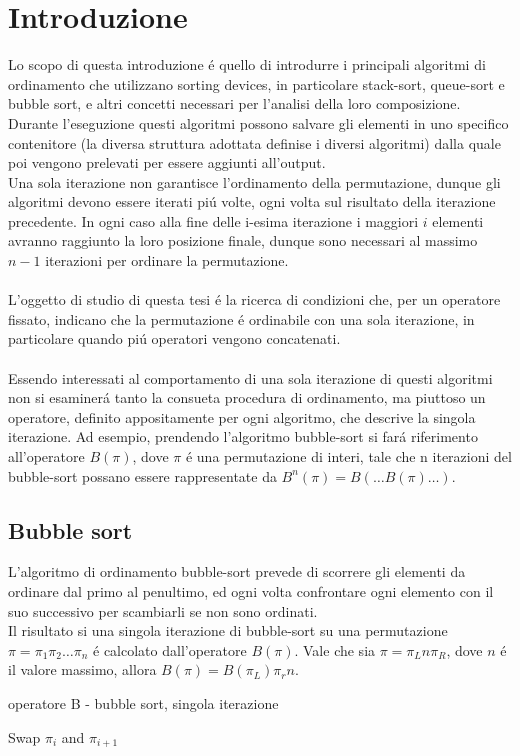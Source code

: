 \chapter{Introduzione}
Lo scopo di questa introduzione \'e quello di introdurre i principali algoritmi di ordinamento che utilizzano sorting devices, in particolare stack-sort,
queue-sort e bubble sort, e altri concetti necessari per l'analisi della loro composizione.\\Durante l'eseguzione questi algoritmi possono 
salvare gli elementi in uno specifico contenitore (la diversa struttura 
adottata definise i diversi algoritmi) dalla quale poi vengono prelevati
per essere aggiunti all'output.\\
Una sola iterazione non garantisce l'ordinamento della permutazione,
dunque gli algoritmi devono essere iterati pi\'u volte, ogni volta sul risultato della iterazione precedente. In ogni caso alla fine delle i-esima
iterazione i maggiori $i$ elementi avranno raggiunto la loro posizione finale, 
dunque sono necessari al massimo $n-1$ iterazioni per ordinare la permutazione.
\\\\L'oggetto di studio di questa tesi \'e la ricerca di condizioni che, per un
operatore fissato, indicano che la permutazione \'e ordinabile con una sola
iterazione, in particolare quando pi\'u operatori vengono concatenati.
\\\\
Essendo interessati al comportamento di una sola iterazione di questi
algoritmi non si esaminer\'a tanto la consueta procedura di ordinamento,
ma piuttoso un operatore, definito appositamente per ogni algoritmo, che
descrive la singola iterazione. 
Ad esempio, prendendo l'algoritmo bubble-sort si far\'a riferimento all'operatore $B(\pi)$, dove $\pi$ \'e una permutazione di
interi, tale che n iterazioni del bubble-sort possano essere rappresentate
da $B^n(\pi) = B(\dots B(\pi)\dots)$.
\section*{Bubble sort}
L'algoritmo di ordinamento bubble-sort prevede di scorrere gli elementi da 
ordinare dal primo al penultimo, ed ogni volta confrontare ogni elemento 
con il suo successivo per scambiarli se non sono ordinati.\\
Il risultato si una singola iterazione di bubble-sort su una permutazione $\pi=\pi_1\pi_2\dots\pi_n$ \'e calcolato dall'operatore $B(\pi)$. Vale che sia $\pi = \pi_Ln\pi_R$, dove $n$ \'e il valore massimo, allora $B(\pi) = B(\pi_L)\pi_rn$.
\begin{algorithm}[H]
   \caption{operatore B - bubble sort, singola iterazione}
\begin{algorithmic}
   \State Swap $\pi_i$ and $\pi_{i+1}$
   \EndIf
   \EndFor
\end{algorithmic}
\end{algorithm}
